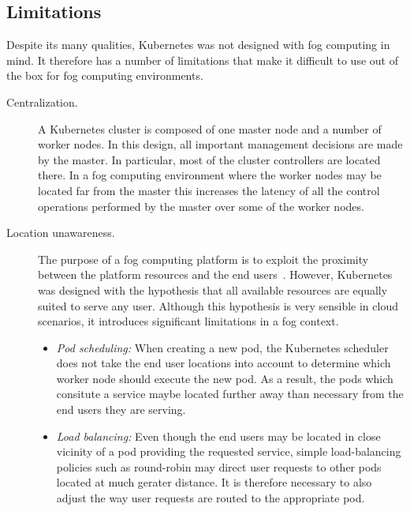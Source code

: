\documentclass[letterpaper,twocolumn,10pt]{article}
\begin{document}
\subsection{Limitations}

Despite its many qualities, Kubernetes was not designed with fog
computing in mind. It therefore has a number of limitations that make
it difficult to use out of the box for fog computing environments.

\begin{description}
\item[Centralization.] A Kubernetes cluster is composed of one master
  node and a number of worker nodes. In this design, all important
  management decisions are made by the master. In particular, most of
  the cluster controllers are located there. In a fog computing
  environment where the worker nodes may be located far from the
  master this increases the latency of all the control operations
  performed by the master over some of the worker nodes.

\item[Location unawareness.]  The purpose of a fog computing platform
  is to exploit the proximity between the platform resources and the
  end users~\cite{Bonomi:2012:FCR:2342509.2342513}. However,
  Kubernetes was designed with the hypothesis that all available
  resources are equally suited to serve any user. Although this
  hypothesis is very sensible in cloud scenarios, it introduces
  significant limitations in a fog context.

  \begin{itemize}[leftmargin=*,itemsep=0pt,topsep=-5pt,labelsep=8pt]
  \item \emph{Pod scheduling:} When creating a new pod, the Kubernetes
    scheduler does not take the end user locations into account to
    determine which worker node should execute the new pod. As a
    result, the pods which consitute a service maybe located further
    away than necessary from the end users they are serving.
  \item \emph{Load balancing:} Even though the end users may be
    located in close vicinity of a pod providing the requested
    service, simple load-balancing policies such as round-robin may
    direct user requests to other pods located at much gerater
    distance. It is therefore necessary to also adjust the way user
    requests are routed to the appropriate pod.
  \end{itemize}
\end{description}
\end{document}
